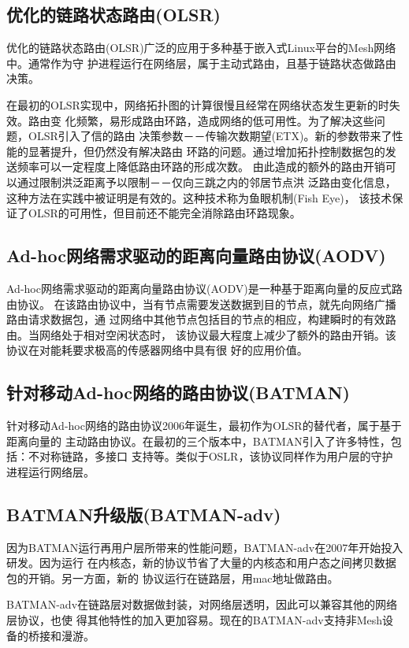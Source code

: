 \subsection{优化的链路状态路由(OLSR)~\cite{OLSR}}
优化的链路状态路由(OLSR)广泛的应用于多种基于嵌入式Linux平台的Mesh网络中。通常作为守
护进程运行在网络层，属于主动式路由，且基于链路状态做路由决策。

在最初的OLSR实现中，网络拓扑图的计算很慢且经常在网络状态发生更新的时失效。路由变
化频繁，易形成路由环路，造成网络的低可用性。为了解决这些问题，OLSR引入了信的路由
决策参数－－传输次数期望(ETX)。新的参数带来了性能的显著提升，但仍然没有解决路由
环路的问题。通过增加拓扑控制数据包的发送频率可以一定程度上降低路由环路的形成次数。
由此造成的额外的路由开销可以通过限制洪泛距离予以限制－－仅向三跳之内的邻居节点洪
泛路由变化信息，这种方法在实践中被证明是有效的。这种技术称为鱼眼机制(Fish Eye)，
该技术保证了OLSR的可用性，但目前还不能完全消除路由环路现象。

\subsection{Ad-hoc网络需求驱动的距离向量路由协议(AODV)~\cite{AODV}}
Ad-hoc网络需求驱动的距离向量路由协议(AODV)是一种基于距离向量的反应式路由协议。
在该路由协议中，当有节点需要发送数据到目的节点，就先向网络广播路由请求数据包，通
过网络中其他节点包括目的节点的相应，构建瞬时的有效路由。当网络处于相对空闲状态时，
该协议最大程度上减少了额外的路由开销。该协议在对能耗要求极高的传感器网络中具有很
好的应用价值。

\subsection{针对移动Ad-hoc网络的路由协议(BATMAN)~\cite{BATMAN}}
针对移动Ad-hoc网络的路由协议2006年诞生，最初作为OLSR的替代者，属于基于距离向量的
主动路由协议。在最初的三个版本中，BATMAN引入了许多特性，包括：不对称链路，多接口
支持等。类似于OSLR，该协议同样作为用户层的守护进程运行网络层。

\subsection{BATMAN升级版(BATMAN-adv)~\cite{BATMAN-adv}}
因为BATMAN运行再用户层所带来的性能问题，BATMAN-adv在2007年开始投入研发。因为运行
在内核态，新的协议节省了大量的内核态和用户态之间拷贝数据包的开销。另一方面，新的
协议运行在链路层，用mac地址做路由。

BATMAN-adv在链路层对数据做封装，对网络层透明，因此可以兼容其他的网络层协议，也使
得其他特性的加入更加容易。现在的BATMAN-adv支持非Mesh设备的桥接和漫游。

